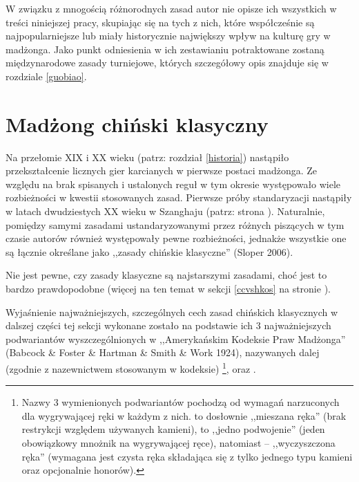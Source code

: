 W związku z mnogością różnorodnych zasad autor nie opisze ich wszystkich w
treści niniejszej pracy, skupiając się na tych z nich, które współcześnie są
najpopularniejsze lub miały historycznie największy wpływ na kulturę gry w
madżonga. Jako punkt odniesienia w ich zestawianiu potraktowane zostaną
międzynarodowe zasady turniejowe, których szczegółowy opis znajduje się w
rozdziale \ref{guobiao}.

\section{Madżong chiński klasyczny}
\label{cc}
\def \refpodwariantycc {\getrefnumber{podwarianty_cc}} 
Na przełomie XIX i XX wieku (patrz: rozdział \ref{historia}) nastąpiło
przekształcenie licznych gier karcianych w pierwsze postaci madżonga. Ze względu
na brak spisanych i ustalonych reguł w tym okresie występowało wiele
rozbieżności w kwestii stosowanych zasad.
Pierwsze próby standaryzacji nastąpiły w latach dwudziestych
XX wieku w Szanghaju (patrz: strona \pageref{shanghai20s}). Naturalnie, pomiędzy
samymi zasadami ustandaryzowanymi przez różnych piszących w tym czasie autorów
również występowały pewne rozbieżności, jednakże wszystkie one są łącznie
określane jako ,,zasady chińskie klasyczne'' (Sloper 2006).

Nie jest pewne, czy zasady klasyczne są najstarszymi zasadami,
choć jest to bardzo prawdopodobne (więcej na ten temat w sekcji \ref{ccvshkos}
na stronie \pageref{ccvshkos}).

Wyjaśnienie najważniejszych, szczególnych cech zasad chińskich klasycznych w
dalszej części tej sekcji wykonane zostało na podstawie ich 3
najważniejszych podwariantów wyszczególnionych w ,,Amerykańskim Kodeksie Praw
Madżonga'' (Babcock \& Foster \& Hartman \& Smith \& Work 1924), nazywanych
dalej (zgodnie z nazewnictwem stosowanym w kodeksie)
\footnote{\label{podwarianty_cc}Nazwy 3 wymienionych
podwariantów pochodzą od wymagań narzuconych dla wygrywającej ręki w każdym z
nich.  to dosłownie ,,mieszana ręka'' (brak restrykcji
względem używanych kamieni),  to ,,jedno podwojenie'' (jeden
obowiązkowy mnożnik na wygrywającej ręce), natomiast  --
,,wyczyszczona ręka'' (wymagana jest czysta ręka składająca się z tylko jednego
typu kamieni oraz opcjonalnie honorów).},
\footnotemark[\refpodwariantycc] oraz
\footnotemark[\refpodwariantycc].

